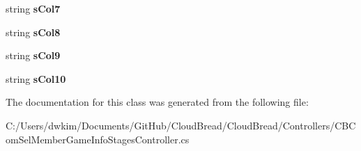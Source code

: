 \begin{DoxyCompactItemize}
\item 
string {\bfseries s\+Col7}\hypertarget{a00158_a7b2fc637b40b6261a14c48a42b90b265}{}\label{a00158_a7b2fc637b40b6261a14c48a42b90b265}

\item 
string {\bfseries s\+Col8}\hypertarget{a00158_aee06a2fa66336ed39152e2db799e15b4}{}\label{a00158_aee06a2fa66336ed39152e2db799e15b4}

\item 
string {\bfseries s\+Col9}\hypertarget{a00158_a11fdec769a0c0edcd6e28e5737d5af35}{}\label{a00158_a11fdec769a0c0edcd6e28e5737d5af35}

\item 
string {\bfseries s\+Col10}\hypertarget{a00158_a3be9ea6a2d84cc4e151a0e3a2ab13a6a}{}\label{a00158_a3be9ea6a2d84cc4e151a0e3a2ab13a6a}

\end{DoxyCompactItemize}


The documentation for this class was generated from the following file\+:\begin{DoxyCompactItemize}
\item 
C\+:/\+Users/dwkim/\+Documents/\+Git\+Hub/\+Cloud\+Bread/\+Cloud\+Bread/\+Controllers/C\+B\+Com\+Sel\+Member\+Game\+Info\+Stages\+Controller.\+cs\end{DoxyCompactItemize}
